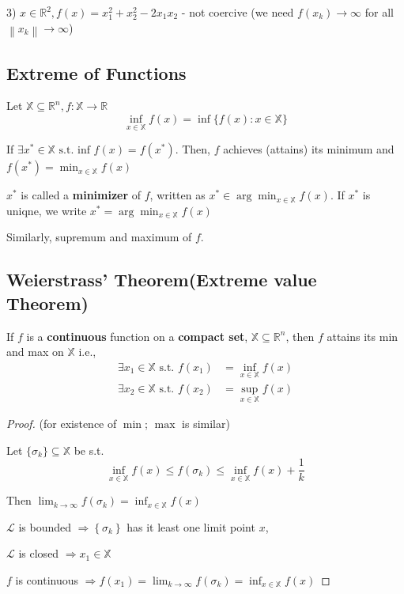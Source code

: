\documentclass[11pt]{elegantbook}
\begin{document}
3) $x \in \mathbb{R}^{2}, f(x)=x_{1}^{2}+x_{2}^{2}-2 x_{1} x_{2}$ - not coercive
(we need $f(x_k)\rightarrow	\infty$ for all $\left\|x_{k}\right\| \rightarrow \infty$)


\subsection{Extreme of Functions}
\begin{definition}
    Let $\mathbb{X} \subseteq \mathbb{R}^{n}, f: \mathbb{X} \rightarrow \mathbb{R}$
    $$\inf_{x \in \mathbb{X}} f(x)=\inf\{f(x): x \in \mathbb{X}\}$$
\end{definition}

If $\exists x^{*} \in \mathbb{X} \text { s.t. inf } f(x)=f\left(x^{*}\right)$. Then, $f$ achieves (attains) its minimum and $f\left(x^{*}\right)=\min _{x \in \mathbb{X}} f(x)$

$x^{*}$ is called a \textbf{minimizer} of $f$, written as $x^{*} \in \arg \min _{x \in \mathbb{X}} f(x)$. If $x^*$ is uniqne, we write $x^{*}=\arg \min _{x \in \mathbb{X}} f(x)
$

Similarly, supremum and maximum of $f$.

\subsection{Weierstrass' Theorem(Extreme value Theorem)}
\begin{theorem}
    \quad

    If $f$ is a \textbf{continuous} function on a \textbf{compact set}, $\mathbb{X} \subseteq \mathbb{R}^{n}$, then $f$ attains its min and max on $\mathbb{X}$ i.e.,
    $$
    \begin{aligned}
    \exists x_1 \in \mathbb{X} \text { s.t. } f\left(x_{1}\right) &=\inf _{x \in \mathbb{X}} f(x) \\
    \exists x_{2} \in \mathbb{X} \text { s.t. } f\left(x_{2}\right) &=\sup _{x \in \mathbb{X}} f(x)
    \end{aligned}
    $$
\end{theorem}
\begin{proof}
    (for existence of $\min$; $\max$ is similar)

    Let $\{\sigma_k\}\subseteq \mathbb{X}$ be s.t.
    $$\inf_{x\in\mathbb{X}} f(x) \leq f\left(\sigma_{k}\right) \leq \inf _{x \in \mathbb{X}} f(x)+\frac{1}{k}$$

    Then $\lim _{k \rightarrow \infty} f\left(\sigma_{k}\right)=\inf_{x\in\mathbb{X}} f(x)$

    $\mathcal{L}$ is bounded $\Rightarrow\left\{\sigma_{k}\right\}$ has it least one limit point $x$,

    $\mathcal{L}$ is closed $\Rightarrow x_{1} \in \mathbb{X}$

    $f$ is continuous $\Rightarrow f\left(x_{1}\right)=\lim _{k \rightarrow \infty} f\left(\sigma_{k}\right)=\inf _{x \in \mathbb{X}} f(x)$
\end{proof}
\end{document}
